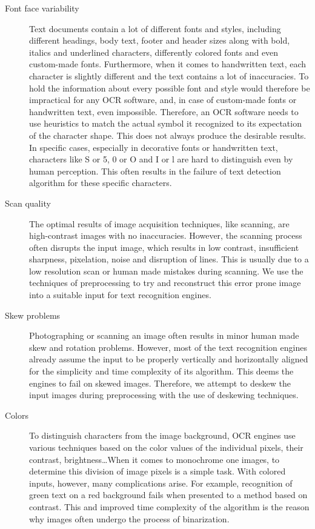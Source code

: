 \begin{description}

\item[Font face variability] Text documents contain a lot of different fonts and styles, including different headings, body text, footer and header sizes along with bold, italics and underlined characters, differently colored fonts and even custom-made fonts. Furthermore, when it comes to handwritten text, each character is slightly different and the text contains a lot of inaccuracies. To hold the information about every possible font and style would therefore be impractical for any OCR software, and, in case of custom-made fonts or handwritten text, even impossible. Therefore, an OCR software needs to use heuristics to match the actual symbol it recognized to its expectation of the character shape. This does not always produce the desirable results. In specific cases, especially in decorative fonts or handwritten text, characters like S or 5, 0 or O and I or l are hard to distinguish even by human perception. This often results in the failure of text detection algorithm for these specific characters.

\item[Scan quality] The optimal results of image acquisition techniques, like scanning, are high-contrast images with no inaccuracies. However, the scanning process often disrupts the input image, which results in low contrast, insufficient sharpness, pixelation, noise and disruption of lines. This is usually due to a low resolution scan or human made mistakes during scanning. We use the techniques of preprocessing to try and reconstruct this error prone image into a suitable input for text recognition engines.

\item[Skew problems] Photographing or scanning an image often results in minor human made skew and rotation problems. However, most of the text recognition engines already assume the input to be properly vertically and horizontally aligned for the simplicity and time complexity of its algorithm. This deems the engines to fail on skewed images. Therefore, we attempt to deskew the input images during preprocessing with the use of deskewing techniques.

\item[Colors] To distinguish characters from the image background, OCR engines use various techniques based on the color values of the individual pixels, their contrast, brightness\ldots When it comes to monochrome one images, to determine this division of image pixels is a simple task. With colored inputs, however, many complications arise. For example, recognition of green text on a red background fails when presented to a method based on contrast. This and improved time complexity of the algorithm is the reason why images often undergo the process of binarization. 

\end{description}

